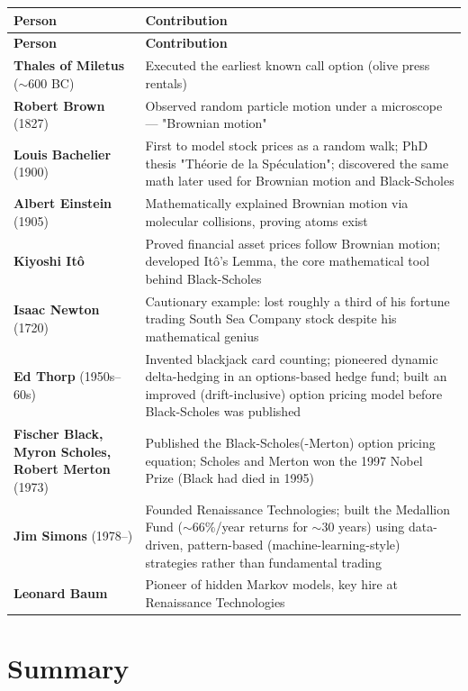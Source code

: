 \documentclass[12pt,openany]{book}
\theoremstyle{definition}
\theoremstyle{remark}
\begin{document}
\begingroup
\small
\begin{longtable}{@{}L{0.240\textwidth}L{0.690\textwidth}@{}}
\toprule
\textbf{Person} & \textbf{Contribution} \\
\midrule
\endfirsthead
\toprule
\textbf{Person} & \textbf{Contribution} \\
\midrule
\endhead
\textbf{Thales of Miletus} (\(\sim\)600 BC) & Executed the earliest known call option (olive press rentals) \\
\textbf{Robert Brown} (1827) & Observed random particle motion under a microscope --- "Brownian motion" \\
\textbf{Louis Bachelier} (1900) & First to model stock prices as a random walk; PhD thesis "Théorie de la Spéculation"; discovered the same math later used for Brownian motion and Black-Scholes \\
\textbf{Albert Einstein} (1905) & Mathematically explained Brownian motion via molecular collisions, proving atoms exist \\
\textbf{Kiyoshi Itô} & Proved financial asset prices follow Brownian motion; developed Itô's Lemma, the core mathematical tool behind Black-Scholes \\
\textbf{Isaac Newton} (1720) & Cautionary example: lost roughly a third of his fortune trading South Sea Company stock despite his mathematical genius \\
\textbf{Ed Thorp} (1950s--60s) & Invented blackjack card counting; pioneered dynamic delta-hedging in an options-based hedge fund; built an improved (drift-inclusive) option pricing model before Black-Scholes was published \\
\textbf{Fischer Black, Myron Scholes, Robert Merton} (1973) & Published the Black-Scholes(-Merton) option pricing equation; Scholes and Merton won the 1997 Nobel Prize (Black had died in 1995) \\
\textbf{Jim Simons} (1978--) & Founded Renaissance Technologies; built the Medallion Fund (\(\sim\)66\%/year returns for \(\sim\)30 years) using data-driven, pattern-based (machine-learning-style) strategies rather than fundamental trading \\
\textbf{Leonard Baum} & Pioneer of hidden Markov models, key hire at Renaissance Technologies \\
\bottomrule
\end{longtable}
\endgroup

\section{Summary}
\end{document}
